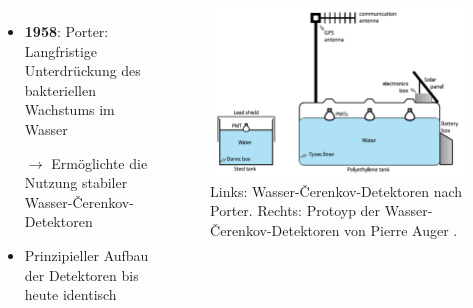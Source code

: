 \documentclass[aspectratio=1610, professionalfonts, 9pt, hyperref={colorlinks=false}]{beamer}
\begin{document}
\begin{frame}{}
  \begin{columns}
      \begin{itemize}
        \setlength\itemsep{0.5em}
        \item \textbf{1958}: Porter: Langfristige Unterdrückung des bakteriellen Wachstums im Wasser
        \item[$\rightarrow$] Ermöglichte die Nutzung stabiler Wasser-Čerenkov-Detektoren
        \item Prinzipieller Aufbau der Detektoren bis heute identisch
      \end{itemize}
        \vspace*{10px}
  
      \begin{figure}
          \centering
          \includegraphics[width=\linewidth]{images/cherenkov}
          \caption{Links: Wasser-Čerenkov-Detektoren nach Porter. Rechts: Protoyp der Wasser-Čerenkov-Detektoren von Pierre Auger \cite{9789400754225}.}
      \end{figure}
  \end{columns}
\end{frame}
\end{document}
